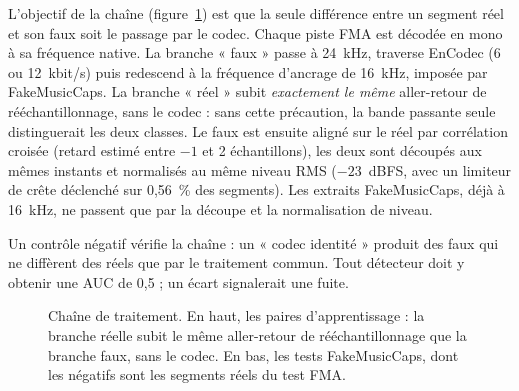 \documentclass[a4paper, 11pt]{article}
\begin{document}
L'objectif de la chaîne (figure~\ref{fig:chaine}) est que la seule différence entre un segment réel et son
faux soit le passage par le codec. Chaque piste FMA est décodée en mono à sa fréquence native. La branche
« faux » passe à 24~kHz, traverse EnCodec (6 ou 12~kbit/s) puis redescend à la fréquence d'ancrage de
16~kHz, imposée par FakeMusicCaps. La branche « réel » subit \emph{exactement le même} aller-retour de
rééchantillonnage, sans le codec : sans cette précaution, la bande passante seule distinguerait les deux
classes. Le faux est ensuite aligné sur le réel par corrélation croisée (retard estimé entre $-1$ et 2
échantillons), les deux sont découpés aux mêmes instants et normalisés au même niveau RMS ($-23$~dBFS,
avec un limiteur de crête déclenché sur 0,56~\% des segments). Les extraits FakeMusicCaps, déjà à 16~kHz,
ne passent que par la découpe et la normalisation de niveau.

Un contrôle négatif vérifie la chaîne : un « codec identité » produit des faux qui ne diffèrent des réels
que par le traitement commun. Tout détecteur doit y obtenir une AUC de 0,5 ; un écart signalerait une fuite.

\begin{figure}[h]
\centering
{}
\caption{Chaîne de traitement. En haut, les paires d'apprentissage : la branche réelle subit le même
aller-retour de rééchantillonnage que la branche faux, sans le codec. En bas, les tests FakeMusicCaps, dont
les négatifs sont les segments réels du test FMA.}
\label{fig:chaine}
\end{figure}
\end{document}
